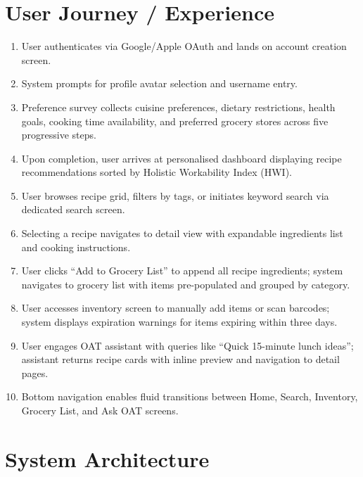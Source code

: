 \documentclass[12pt]{article}
\begin{document}
\section{User Journey / Experience}
\begin{enumerate}
  \item User authenticates via Google/Apple OAuth and lands on account creation screen.
  \item System prompts for profile avatar selection and username entry.
  \item Preference survey collects cuisine preferences, dietary restrictions, health goals, cooking time availability, and preferred grocery stores across five progressive steps.
  \item Upon completion, user arrives at personalised dashboard displaying recipe recommendations sorted by Holistic Workability Index (HWI).
  \item User browses recipe grid, filters by tags, or initiates keyword search via dedicated search screen.
  \item Selecting a recipe navigates to detail view with expandable ingredients list and cooking instructions.
  \item User clicks ``Add to Grocery List'' to append all recipe ingredients; system navigates to grocery list with items pre-populated and grouped by category.
  \item User accesses inventory screen to manually add items or scan barcodes; system displays expiration warnings for items expiring within three days.
  \item User engages OAT assistant with queries like ``Quick 15-minute lunch ideas''; assistant returns recipe cards with inline preview and navigation to detail pages.
  \item Bottom navigation enables fluid transitions between Home, Search, Inventory, Grocery List, and Ask OAT screens.
\end{enumerate}

\section{System Architecture}
\end{document}
